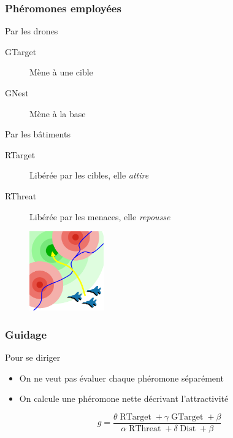 \documentclass{beamer}
\begin{document}
\begin{frame}

  \frametitle{Phéromones employées}

  \begin{block}{Par les drones}
    \begin{description}
    \item[GTarget]{Mène à une cible}
    \item[GNest]{Mène à la base}
    \end{description}
  \end{block}

  \begin{block}{Par les bâtiments}
    \begin{description}
    \item[RTarget]{Libérée par les cibles, elle \textit{attire}}
    \item[RThreat]{Libérée par les menaces, elle \textit{repousse}}
    \end{description}
  \end{block}

  \vfill

  \begin{figure}
    \centering
    \includegraphics[width=3.2cm]{terrain_field.png}
  \end{figure}

\end{frame}

\begin{frame}

  \frametitle{Guidage}

  \begin{block}{Pour se diriger}
    \begin{itemize}
    \item{On ne veut pas évaluer chaque phéromone séparément}
    \item{On calcule une phéromone nette décrivant l'attractivité}
    \end{itemize}
  \end{block}

  \vfill

  $$g = \frac{ \theta \operatorname{RTarget} + \gamma \operatorname{GTarget} + \beta}{\alpha \operatorname{RThreat} + \delta \operatorname{Dist} + \beta}$$

\end{frame}
\end{document}

